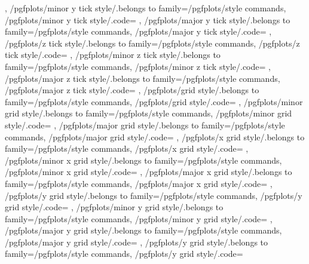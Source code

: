 {{	},
	/pgfplots/minor y tick style/.belongs to family=/pgfplots/style commands,
	/pgfplots/minor y tick style/.code={%
	},
	/pgfplots/major y tick style/.belongs to family=/pgfplots/style commands,
	/pgfplots/major y tick style/.code={%
	},
	/pgfplots/z tick style/.belongs to family=/pgfplots/style commands,
	/pgfplots/z tick style/.code={%
	},
	/pgfplots/minor z tick style/.belongs to family=/pgfplots/style commands,
	/pgfplots/minor z tick style/.code={%
	},
	/pgfplots/major z tick style/.belongs to family=/pgfplots/style commands,
	/pgfplots/major z tick style/.code={%
	},
	/pgfplots/grid style/.belongs to family=/pgfplots/style commands,
	/pgfplots/grid style/.code={%
	},
	/pgfplots/minor grid style/.belongs to family=/pgfplots/style commands,
	/pgfplots/minor grid style/.code={%
	},
	/pgfplots/major grid style/.belongs to family=/pgfplots/style commands,
	/pgfplots/major grid style/.code={%
	},
	/pgfplots/x grid style/.belongs to family=/pgfplots/style commands,
	/pgfplots/x grid style/.code={%
	},
	/pgfplots/minor x grid style/.belongs to family=/pgfplots/style commands,
	/pgfplots/minor x grid style/.code={%
	},
	/pgfplots/major x grid style/.belongs to family=/pgfplots/style commands,
	/pgfplots/major x grid style/.code={%
	},
	/pgfplots/y grid style/.belongs to family=/pgfplots/style commands,
	/pgfplots/y grid style/.code={%
	},
	/pgfplots/minor y grid style/.belongs to family=/pgfplots/style commands,
	/pgfplots/minor y grid style/.code={%
	},
	/pgfplots/major y grid style/.belongs to family=/pgfplots/style commands,
	/pgfplots/major y grid style/.code={%
	},
	/pgfplots/y grid style/.belongs to family=/pgfplots/style commands,
	/pgfplots/y grid style/.code={%
}}
